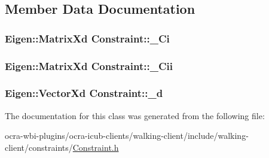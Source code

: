 \subsection{\-Member \-Data \-Documentation}
\hypertarget{classConstraint_a71217c52597267a96e6bd2d9ed48740f}{
\subsubsection[{\-\_\-\-Ci}]{\setlength{\rightskip}{0pt plus 5cm}\-Eigen\-::\-Matrix\-Xd {\bf \-Constraint\-::\-\_\-\-Ci}}}\label{classConstraint_a71217c52597267a96e6bd2d9ed48740f}
\hypertarget{classConstraint_a6cc83eda35602acec07aab75e9f209dd}{
\subsubsection[{\-\_\-\-Cii}]{\setlength{\rightskip}{0pt plus 5cm}\-Eigen\-::\-Matrix\-Xd {\bf \-Constraint\-::\-\_\-\-Cii}}}\label{classConstraint_a6cc83eda35602acec07aab75e9f209dd}
\hypertarget{classConstraint_a97db6afdcd2827da0dbe3a4e6cd13b7f}{
\subsubsection[{\-\_\-d}]{\setlength{\rightskip}{0pt plus 5cm}\-Eigen\-::\-Vector\-Xd {\bf \-Constraint\-::\-\_\-d}}}\label{classConstraint_a97db6afdcd2827da0dbe3a4e6cd13b7f}


\-The documentation for this class was generated from the following file\-:\begin{DoxyCompactItemize}
\item 
ocra-\/wbi-\/plugins/ocra-\/icub-\/clients/walking-\/client/include/walking-\/client/constraints/\hyperlink{Constraint_8h}{\-Constraint.\-h}\end{DoxyCompactItemize}

